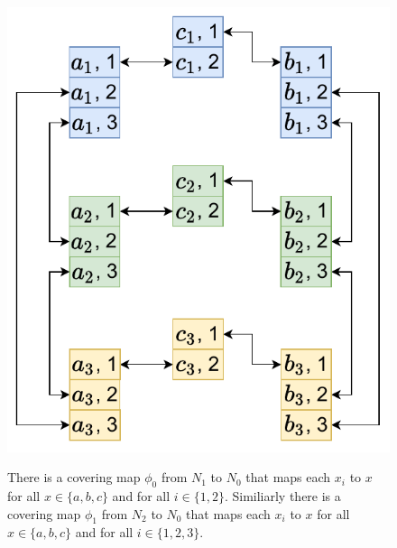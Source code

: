 \begin{figure}[H]
{    \includegraphics[scale=0.50]{diagrams/covering_map_5c.pdf}
  }
  \caption{
    There is a covering map $\phi_0$ from $N_1$ to $N_0$ that maps each $x_i$ to $x$ for all $x \in \{a, b, c\}$ and for all $i \in \{1, 2\}$.
    Similiarly there is a covering map $\phi_1$ from $N_2$ to $N_0$ that maps each $x_i$ to $x$ for all $x \in \{a, b, c\}$ and for all $i \in \{1, 2, 3\}$.
  }
  \label{fig:covering_map3}
\end{figure}





